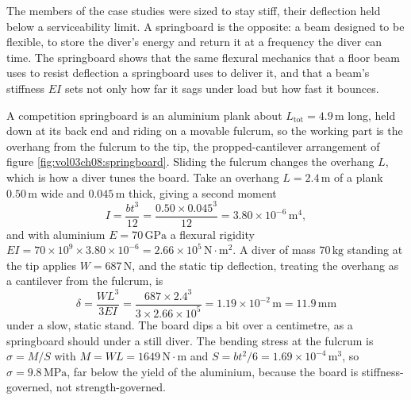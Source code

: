 The members of the case studies were sized to stay stiff, their
deflection held below a serviceability limit. A springboard is the
opposite: a beam designed to be flexible, to store the diver's energy
and return it at a frequency the diver can time. The springboard shows
that the same flexural mechanics that a floor beam uses to resist
deflection a springboard uses to deliver it, and that a beam's stiffness
$EI$ sets not only how far it sags under load but how fast it bounces.



A competition springboard is an aluminium plank about $L_{\text{tot}} =
4.9\,\si{\meter}$ long, held down at its back end and riding on a movable
fulcrum, so the working part is the overhang from the fulcrum to the tip,
the propped-cantilever arrangement of figure
\ref{fig:vol03ch08:springboard}. Sliding the fulcrum changes the overhang
$L$, which is how a diver tunes the board. Take an overhang $L =
2.4\,\si{\meter}$ of a plank $0.50\,\si{\meter}$ wide and $0.045\,\si{
\meter}$ thick, giving a second moment
\[
I = \frac{b t^3}{12} = \frac{0.50 \times 0.045^3}{12}
= 3.80 \times 10^{-6}\,\si{\meter\tothe{4}},
\]
and with aluminium $E = 70\,\text{GPa}$ a flexural rigidity $EI = 70
\times 10^9 \times 3.80 \times 10^{-6} = 2.66 \times 10^5\,\text{N}\cdot
\si{\meter\squared}$. A diver of mass $70\,\si{\kilogram}$ standing at the
tip applies $W = 687\,\text{N}$, and the static tip deflection, treating
the overhang as a cantilever from the fulcrum, is
\[
\delta = \frac{W L^3}{3 EI}
= \frac{687 \times 2.4^3}{3 \times 2.66 \times 10^5}
= 1.19 \times 10^{-2}\,\si{\meter} = 11.9\,\si{\milli\meter}
\]
under a slow, static stand. The board dips a bit over a centimetre, as a
springboard should under a still diver. The bending stress at the fulcrum
is $\sigma = M/S$ with $M = W L = 1649\,\text{N}\cdot\text{m}$ and $S =
b t^2/6 = 1.69 \times 10^{-4}\,\si{\meter\cubed}$, so $\sigma =
9.8\,\text{MPa}$, far below the yield of the aluminium, because the board
is stiffness-governed, not strength-governed.

